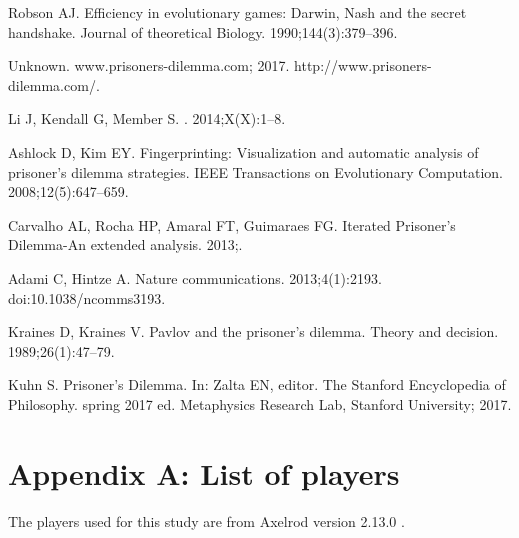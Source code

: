 \documentclass[10pt,letterpaper]{article}
\begin{document}
\begin{thebibliography}{10}
Robson AJ.
\newblock Efficiency in evolutionary games: Darwin, Nash and the secret
  handshake.
\newblock Journal of theoretical Biology. 1990;144(3):379--396.

Unknown. www.prisoners-dilemma.com; 2017.
\newblock http://www.prisoners-dilemma.com/.

Li J, Kendall G, Member S.
. 2014;X(X):1--8.

Ashlock D, Kim EY.
\newblock Fingerprinting: Visualization and automatic analysis of prisoner's
  dilemma strategies.
\newblock IEEE Transactions on Evolutionary Computation. 2008;12(5):647--659.

Carvalho AL, Rocha HP, Amaral FT, Guimaraes FG.
\newblock Iterated Prisoner’s Dilemma-An extended analysis. 2013;.

Adami C, Hintze A.
\newblock Nature communications. 2013;4(1):2193.
\newblock doi:{10.1038/ncomms3193}.

Kraines D, Kraines V.
\newblock Pavlov and the prisoner's dilemma.
\newblock Theory and decision. 1989;26(1):47--79.

Kuhn S.
\newblock Prisoner's Dilemma.
\newblock In: Zalta EN, editor. The Stanford Encyclopedia of Philosophy. spring
  2017 ed. Metaphysics Research Lab, Stanford University; 2017.


\end{thebibliography}

\appendix

\section{Appendix A: List of players}\label{app:list_of_players}

The players used for this study are from Axelrod version 2.13.0
\cite{axelrodproject}.
\end{document}
